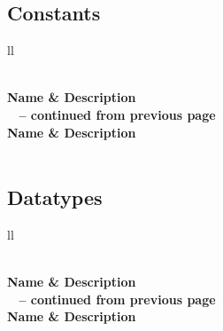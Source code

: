 \documentclass[a4paper,11pt]{article}
\begin{document}
\subsection{Constants}
\begin{longtable}[H!]{ll}
\caption{{\bfseries List of constants.}}
\label{Table: constants}\\
\toprule 
\bfseries Name & \bfseries Description \\ \hline 
\midrule
\endfirsthead
{}%
{{\bfseries \tablename\ \thetable{} -- continued from previous page}} \\
\toprule
\bfseries Name & \bfseries Description \\ \hline 
\midrule
\endhead
{} \\
\endfoot
\bottomrule
\endlastfoot
\end{longtable}
\subsection{Datatypes}
\begin{longtable}[H!]{ll}
\caption{{\bfseries List of attributes for ADTs.}}
\label{Table: datatypes}\\
\toprule 
\bfseries Name & \bfseries Description \\ \hline 
\midrule
\endfirsthead
{}%
{{\bfseries \tablename\ \thetable{} -- continued from previous page}} \\
\toprule
\bfseries Name & \bfseries Description \\ \hline 
\midrule
\endhead
{} \\
\endfoot
\bottomrule
\endlastfoot
\end{longtable}

\printindex
\end{document}
